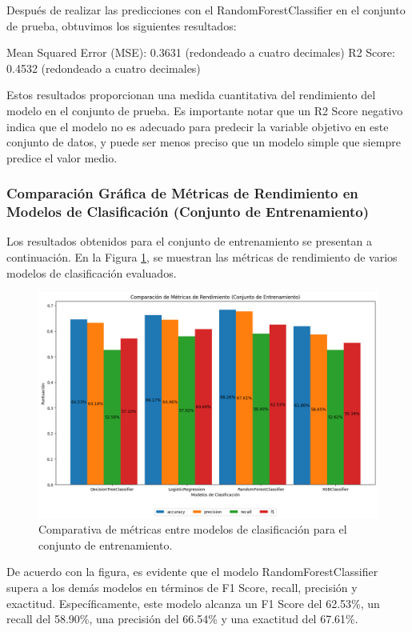 Después de realizar las predicciones con el RandomForestClassifier en el conjunto de prueba, obtuvimos los siguientes resultados:

Mean Squared Error (MSE): 0.3631 (redondeado a cuatro decimales)
R2 Score: 0.4532 (redondeado a cuatro decimales)

Estos resultados proporcionan una medida cuantitativa del rendimiento del modelo en el conjunto de prueba. Es importante notar que un R2 Score negativo indica que el modelo no es adecuado para predecir la variable objetivo en este conjunto de datos, y puede ser menos preciso que un modelo simple que siempre predice el valor medio.


\subsubsection{Comparación Gráfica de Métricas de Rendimiento en Modelos de Clasificación (Conjunto de Entrenamiento)}

Los resultados obtenidos para el conjunto de entrenamiento se presentan a continuación. En la Figura \ref{fig:metricas_clasificacion}, se muestran las métricas de rendimiento de varios modelos de clasificación evaluados.

\begin{figure}[H]
    \centering
    \includegraphics[width=1\textwidth]{img/compara_algoritmos/metricasEntreModelosClasificacion.png}
    \caption{Comparativa de métricas entre modelos de clasificación para el conjunto de entrenamiento.}
    \label{fig:metricas_clasificacion}
\end{figure}

De acuerdo con la figura, es evidente que el modelo RandomForestClassifier supera a los demás modelos en términos de F1 Score, recall, precisión y exactitud. Específicamente, este modelo alcanza un F1 Score del 62.53\%, un recall del 58.90\%, una precisión del 66.54\% y una exactitud del 67.61\%.

